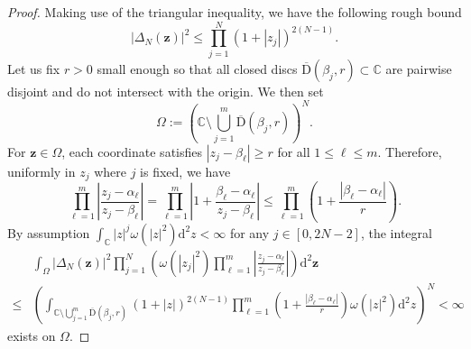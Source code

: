 \documentclass[pdflatex,sn-mathphys-num]{sn-jnl}
\theoremstyle{thmstyleone}
\numberwithin{equation}{section}
\newcommand{\C}{\mathbb{C}}
\begin{document}
\begin{proof}
    Making use of the triangular inequality, we have the following rough bound
    \begin{equation}
        \left|\Delta_{N}(\mathbf{z})\right|^{2}\leq \prod\limits_{j=1}^{N}(1+\left|z_{j}\right|)^{2(N-1)}.
    \end{equation}
    Let us fix $r>0$ small enough so that all closed discs $\overline{\mathrm{D}}(\beta_{j},r)\subset\C$ are pairwise disjoint and do not intersect with the origin. We then set
    \begin{equation}
        \Omega:=\left(\C\setminus \bigcup\limits_{j=1}^{m}\overline{\mathrm{D}}(\beta_{j},r)\right)^{N}.
    \end{equation}
    For $\mathbf{z}\in\Omega$, each coordinate satisfies $\left|z_{j}-\beta_{\ell}\right|\geq r$ for all $1\leq \ell\leq m$. Therefore, uniformly in $z_{j}$ where $j$ is fixed, we have
    \begin{equation}
        \prod\limits_{\ell=1}^{m}\left|\frac{z_{j}-\alpha_{\ell}}{z_{j}-\beta_{\ell}}\right|=\prod\limits_{\ell=1}^{m}\left|1+\frac{\beta_{\ell}-\alpha_{\ell}}{z_{j}-\beta_{\ell}}\right|\leq \prod\limits_{\ell=1}^{m}\left(1+\frac{|\beta_{\ell}-\alpha_{\ell}|}{r}\right).
    \end{equation}
    By assumption $\int_{\C}|z|^{j}\omega(|z|^2)\mathrm{d}^2z<\infty$ for any $j\in[0,2N-2]$, the integral 
    \begin{equation}
    \begin{split}
        &\int_{\Omega}\left|\Delta_{N}(\mathbf{z})\right|^{2}\prod\limits_{j=1}^{N}\left(\omega(\left|z_{j}\right|^{2})\prod\limits_{\ell=1}^{m}\left|\frac{z_{j}-\alpha_{\ell}}{z_{j}-\beta_{\ell}}\right|\right)\mathrm{d}^{2}\mathbf{z}
        \\
        \leq&\left(\int_{\C\setminus \bigcup\limits_{j=1}^{m}\overline{\mathrm{D}}(\beta_{j},r)}(1+\left|z\right|)^{2(N-1)}\prod\limits_{\ell=1}^{m}\left(1+\frac{|\beta_{\ell}-\alpha_{\ell}|}{r}\right)\omega(|z|^2)\mathrm{d}^2z\right)^N<\infty
    \end{split}
    \end{equation}
    exists on $\Omega$.



\end{proof}
\end{document}

